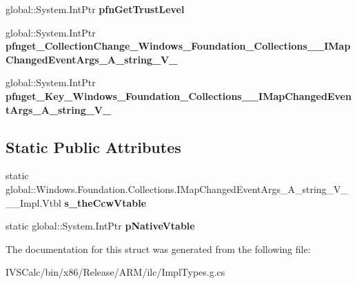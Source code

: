 \begin{DoxyCompactItemize}
global\+::\+System.\+Int\+Ptr {\bfseries pfn\+Get\+Trust\+Level}
\item 
\mbox{\label{struct_windows_1_1_foundation_1_1_collections_1_1_i_map_changed_event_args___a__string___v_______impl_1_1_vtbl_ae816d75ebecacf1ceec60539b4260322}} 
global\+::\+System.\+Int\+Ptr {\bfseries pfnget\+\_\+\+Collection\+Change\+\_\+\+Windows\+\_\+\+Foundation\+\_\+\+Collections\+\_\+\+\_\+\+I\+Map\+Changed\+Event\+Args\+\_\+\+A\+\_\+string\+\_\+\+V\+\_\+}
\item 
\mbox{\label{struct_windows_1_1_foundation_1_1_collections_1_1_i_map_changed_event_args___a__string___v_______impl_1_1_vtbl_a0e98884044d59c4ae1e3be292bb48223}} 
global\+::\+System.\+Int\+Ptr {\bfseries pfnget\+\_\+\+Key\+\_\+\+Windows\+\_\+\+Foundation\+\_\+\+Collections\+\_\+\+\_\+\+I\+Map\+Changed\+Event\+Args\+\_\+\+A\+\_\+string\+\_\+\+V\+\_\+}
\end{DoxyCompactItemize}
\subsection*{Static Public Attributes}
\begin{DoxyCompactItemize}
\item 
\mbox{\label{struct_windows_1_1_foundation_1_1_collections_1_1_i_map_changed_event_args___a__string___v_______impl_1_1_vtbl_ad01117a8887990e6cfd1909544034f25}} 
static global\+::\+Windows.\+Foundation.\+Collections.\+I\+Map\+Changed\+Event\+Args\+\_\+\+A\+\_\+string\+\_\+\+V\+\_\+\+\_\+\+\_\+\+Impl.\+Vtbl {\bfseries s\+\_\+the\+Ccw\+Vtable}
\item 
\mbox{\label{struct_windows_1_1_foundation_1_1_collections_1_1_i_map_changed_event_args___a__string___v_______impl_1_1_vtbl_a9f6c644694c8c4316ca8e7e4d3c16289}} 
static global\+::\+System.\+Int\+Ptr {\bfseries p\+Native\+Vtable}
\end{DoxyCompactItemize}


The documentation for this struct was generated from the following file\+:\begin{DoxyCompactItemize}
\item 
I\+V\+S\+Calc/bin/x86/\+Release/\+A\+R\+M/ilc/Impl\+Types.\+g.\+cs\end{DoxyCompactItemize}
